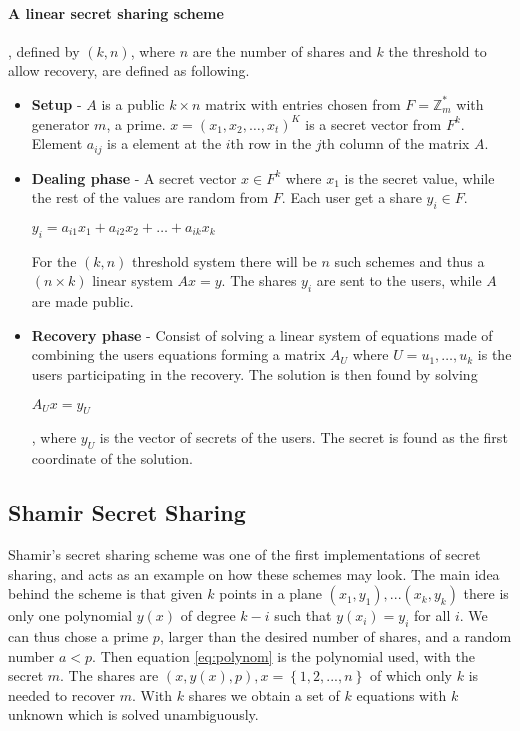 \paragraph{A linear secret sharing scheme \cite{lsss}}, defined by $(k,n)$, where $n$ are the number of shares and $k$ the threshold to allow recovery, are defined as following.\\
\begin{itemize}
\item \textbf{Setup} -  $A$ is a public $k\times n$ matrix with entries chosen from $F = \mathbb{Z}_m^*$ with generator $m$, a prime. $x=(x_1,x_2,\dots,x_t)^K$ is a secret vector from $F^k$. Element $a_{ij}$ is a element at the $i$th row in the $j$th column of the matrix $A$.
\item \textbf{Dealing phase} - A secret vector $x \in F^k$ where $x_1$ is the secret value, while the rest of the values are random from $F$. Each user get a share $y_i \in F$.
\centerline{$y_i = a_{i1}x_1 + a_{i2}x_2 + \dots + a_{ik}x_k$}
For the $(k,n)$ threshold system there will be $n$ such schemes and thus a $(n\times k)$ linear system $Ax=y$.
The shares $y_i$ are sent to the users, while $A$ are made public.
\item \textbf{Recovery phase} - Consist of solving a linear system of equations made of combining the users equations forming a matrix $A_U$ where $U = {u_1, \dots, u_k}$ is the users participating in the recovery. The solution is then found by solving 
\centerline{$A_Ux=y_U$}, where $y_U$ is the vector of secrets of the users. The secret is found as the first coordinate of the solution.
\end{itemize}

\subsection{Shamir Secret  Sharing}\label{sec:secret_sharing}
 Shamir's secret sharing scheme \cite{shamir_share} was one of the first implementations of secret sharing, and acts as an example on how these schemes may look. The main idea behind the scheme is that given $k$ points in a plane $(x_1,y_1), ... (x_k,y_k)$ there is only one polynomial $y(x)$ of degree $k-i$ such that $y(x_i) = y_i$ for all $i$. We can thus chose a prime $p$, larger than the desired number of shares, and a random number $a < p$. Then equation \ref{eq:polynom} is the polynomial used, with the secret $m$. The shares are $(x, y(x), p) , x=\left\{ {1,2, ... ,n}\right\}$ of which only $k$ is needed to recover $m$. With $k$ shares we obtain a set of $k$ equations with $k$ unknown which is solved unambiguously.

